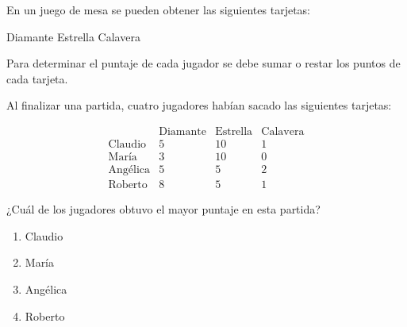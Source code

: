\begin{problem}
    En un juego de mesa se pueden obtener las siguientes tarjetas:

    \begin{center}
    Diamante \quad Estrella \quad Calavera
    \end{center}

    Para determinar el puntaje de cada jugador se debe sumar o restar los puntos de cada tarjeta.

    Al finalizar una partida, cuatro jugadores habían sacado las siguientes tarjetas:

    \[
    \begin{array}{c|ccc}
     & \text{Diamante} & \text{Estrella} & \text{Calavera} \\
    \hline
    \text{Claudio} & 5 & 10 & 1 \\
    \text{María} & 3 & 10 & 0 \\
    \text{Angélica} & 5 & 5 & 2 \\
    \text{Roberto} & 8 & 5 & 1
    \end{array}
    \]

    ¿Cuál de los jugadores obtuvo el mayor puntaje en esta partida?

    \begin{enumerate}[label=\Alph*.]
        \item Claudio
        \item María
        \item Angélica
        \item Roberto
    \end{enumerate}
\end{problem}
